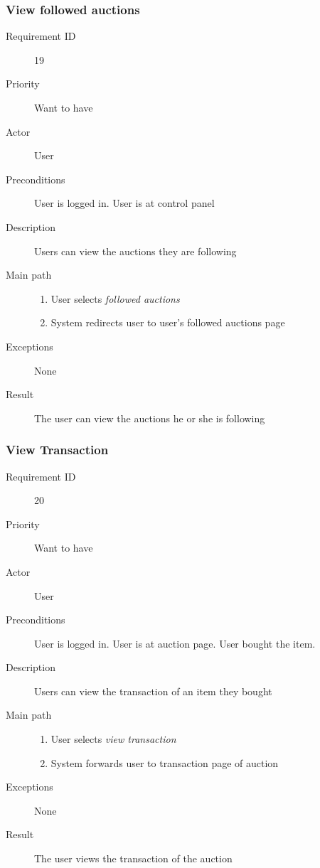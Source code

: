 		\subsubsection{View followed auctions}
			\begin{description}
				\item[Requirement ID] 19
				\item[Priority] Want to have
				\item[Actor] User
				\item[Preconditions] User is logged in. User is at control panel
				\item[Description] Users can view the auctions they are following
				\item[Main path]
 					\begin{enumerate}
						\item User selects \emph{followed auctions}
						\item System redirects user to user's followed auctions page
					\end{enumerate}
				\item[Exceptions] None
				\item[Result] The user can view the auctions he or she is following
			\end{description}
		\subsubsection{View Transaction}
			\begin{description}
				\item[Requirement ID] 20
				\item[Priority] Want to have
				\item[Actor] User
				\item[Preconditions] User is logged in. User is at auction page. User bought the item.
				\item[Description] Users can view the transaction of an item they bought
				\item[Main path]
 					\begin{enumerate}
						\item User selects \emph{view transaction}
						\item System forwards user to transaction page of auction
					\end{enumerate}
				\item[Exceptions] None
				\item[Result] The user views the transaction of the auction
			\end{description}
